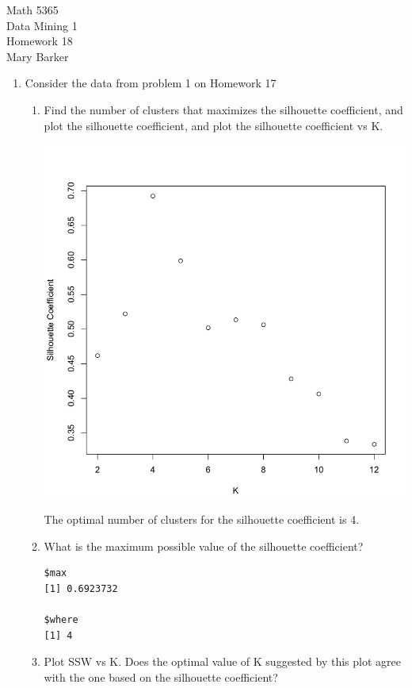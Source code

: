\documentclass[11pt]{article}
\begin{document}
\noindent\large{Math 5365}\\
\large{Data Mining 1}\\
\large{Homework 18}\\
\large{Mary Barker}
\doublespace
\begin{enumerate}
\item 
 Consider the data from problem 1 on Homework 17 

\begin{enumerate}
\item
 Find the number of clusters that maximizes the silhouette coefficient, 
 and plot the silhouette coefficient, and plot the silhouette 
 coefficient vs K. 

\begin{center}
\includegraphics[scale=0.35]{pix/silhouette_k}
\end{center}

The optimal number of clusters for the silhouette coefficient is 4.


\item What is the maximum possible value of the silhouette coefficient? 
\begin{Verbatim}
$max
[1] 0.6923732

$where
[1] 4
\end{Verbatim}


\item
 Plot SSW vs K. Does the optimal value of K suggested by this plot agree 
 with the one based on the silhouette coefficient? 


\end{enumerate}
\end{enumerate}
\end{document}
